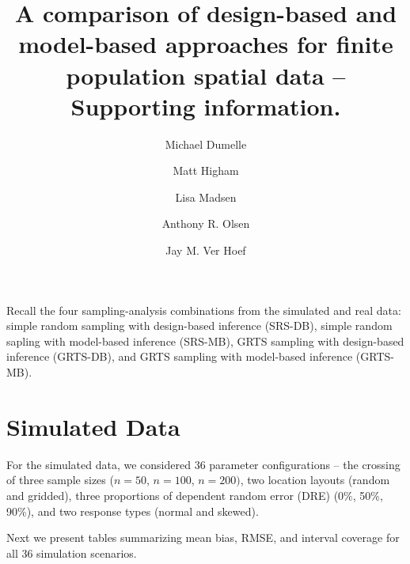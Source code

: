 \documentclass[]{elsarticle} %
\begin{document}
\begin{frontmatter}

  \title{A comparison of design-based and model-based approaches for finite
population spatial data -- Supporting information.}
    \author[USEPA]{Michael Dumelle}
  
    \author[STLAW]{Matt Higham}
  
    \author[OSU]{Lisa Madsen}
  
    \author[USEPA]{Anthony R. Olsen}
  
    \author[NOAA]{Jay M. Ver Hoef}
  
      \address[USEPA]{United States Environmental Protection Agency, 200 SW 35th St,
Corvallis, Oregon, 97333}
    \address[STLAW]{Saint Lawrence University Department of Mathematics, Computer Science,
and Statistics, 23 Romoda Drive, Canton, New York, 13617}
    \address[OSU]{Oregon State University Department of Statistics, 239 Weniger Hall,
Corvallis, Oregon, 97331}
    \address[NOAA]{Marine Mammal Laboratory, Alaska Fisheries Science Center, National
Oceanic and Atmospheric Administration, Seattle, Washington, 98115}
  
  \begin{abstract}
  
  \end{abstract}
  
 \end{frontmatter}

Recall the four sampling-analysis combinations from the simulated and
real data: simple random sampling with design-based inference (SRS-DB),
simple random sapling with model-based inference (SRS-MB), GRTS sampling
with design-based inference (GRTS-DB), and GRTS sampling with
model-based inference (GRTS-MB).

\hypertarget{sec:simtabs}{%
\section{Simulated Data}\label{sec:simtabs}}

For the simulated data, we considered 36 parameter configurations -- the
crossing of three sample sizes (\(n = 50\), \(n = 100\), \(n = 200)\),
two location layouts (random and gridded), three proportions of
dependent random error (DRE) (0\%, 50\%, 90\%), and two response types
(normal and skewed).

Next we present tables summarizing mean bias, RMSE, and interval
coverage for all 36 simulation scenarios.
\end{document}
